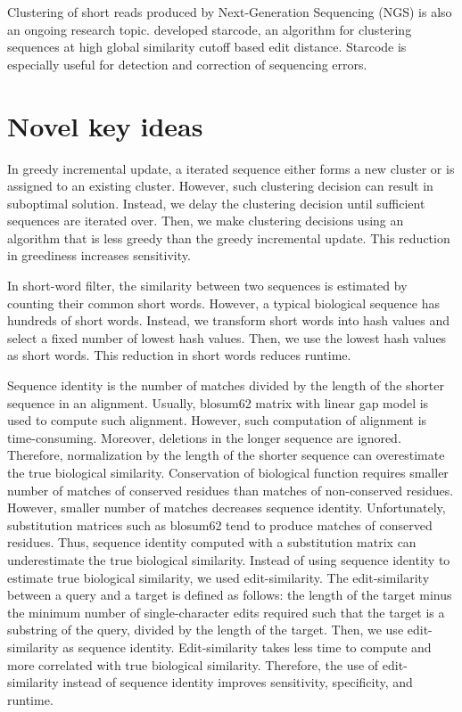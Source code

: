 \documentclass[]{article}
\begin{document}
Clustering of short reads produced by Next-Generation Sequencing (NGS) is also an ongoing research topic.
 developed starcode, an algorithm for clustering sequences at high global similarity cutoff based edit distance.
Starcode is especially useful for detection and correction of sequencing errors. 

\section{Novel key ideas}

In greedy incremental update, a iterated sequence either forms a new cluster or is assigned to an existing cluster.
However, such clustering decision can result in suboptimal solution.
Instead, we delay the clustering decision until sufficient sequences are iterated over.
Then, we make clustering decisions using an algorithm that is less greedy than the greedy incremental update.
This reduction in greediness increases sensitivity.

In short-word filter, the similarity between two sequences is estimated by counting their common short words.
However, a typical biological sequence has hundreds of short words.
Instead, we transform short words into hash values and select a fixed number of lowest hash values.
Then, we use the lowest hash values as short words.
This reduction in short words reduces runtime.

Sequence identity is the number of matches divided by the length of the shorter sequence in an alignment.
Usually, blosum62 matrix with linear gap model is used to compute such alignment.
However, such computation of alignment is time-consuming.
Moreover, deletions in the longer sequence are ignored.
Therefore, normalization by the length of the shorter sequence can overestimate the true biological similarity.
Conservation of biological function requires smaller number of matches of conserved residues than matches of non-conserved residues. 
However, smaller number of matches decreases sequence identity.
Unfortunately, substitution matrices such as blosum62 tend to produce matches of conserved residues.
Thus, sequence identity computed with a substitution matrix can underestimate the true biological similarity.
Instead of using sequence identity to estimate true biological similarity, we used edit-similarity.
The edit-similarity between a query and a target is defined as follows: 
	the length of the target minus the minimum number of single-character edits required such that the target is a substring of the query, divided by the length of the target.
Then, we use edit-similarity as sequence identity.
Edit-similarity takes less time to compute and more correlated with true biological similarity.
Therefore, the use of edit-similarity instead of sequence identity improves sensitivity, specificity, and runtime.
\end{document}
